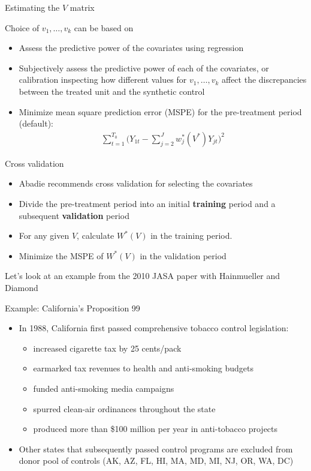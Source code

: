 \documentclass{beamer}
\begin{document}
\begin{frame}{Estimating the $V$ matrix}
	
 Choice of $v_1, \dots, v_k$ can be based on
		\begin{itemize}
		\item Assess the predictive power of the covariates using regression
		\item Subjectively assess the predictive power of each of the covariates, or calibration inspecting how different values for $v_1, \dots, v_k$ affect the discrepancies between the treated unit and the synthetic control
		\item Minimize mean square prediction error (MSPE) for the pre-treatment period (default):
			\begin{eqnarray*}
			\sum_{t=1}^{T_0} \bigg(Y_{1t} - \sum_{j=2}^J w_j^*(V^*)Y_{jt} \bigg)^2
			\end{eqnarray*}
		\end{itemize}
\end{frame}

\begin{frame}{Cross validation}

\begin{itemize}
		\item Abadie recommends cross validation for selecting the covariates
		\item Divide the pre-treatment period into an initial \textbf{training} period and a subsequent \textbf{validation} period
		\item For any given $V$, calculate $W^*(V)$ in the training period.
		\item Minimize the MSPE of $W^*(V)$ in the validation period
\end{itemize}

\bigskip

Let's look at an example from the 2010 JASA paper with Hainmueller and Diamond

\end{frame}



\begin{frame}{Example: California's Proposition 99}
	
	\begin{itemize}
	\item In 1988, California first passed comprehensive tobacco control legislation:
		\begin{itemize}
		\item increased cigarette tax by 25 cents/pack
		\item earmarked tax revenues to health and anti-smoking budgets
		\item funded anti-smoking media campaigns
		\item spurred clean-air ordinances throughout the state
		\item produced more than \$100 million per year in anti-tobacco projects
		\end{itemize}
	\item Other states that subsequently passed control programs are excluded from donor pool of controls (AK, AZ, FL, HI, MA, MD, MI, NJ, OR, WA, DC)
	\end{itemize}
\end{frame}
\end{document}
